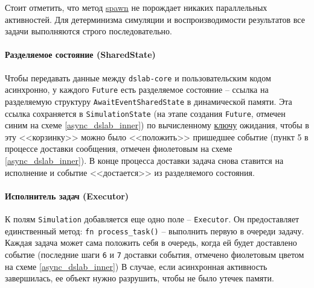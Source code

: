 Стоит отметить, что метод \hyperref[spawn]{spawn} не порождает никаких параллельных активностей. Для детерминизма симуляции и воспроизводимости результатов все задачи выполняются строго последовательно.



\paragraph{Разделяемое состояние (SharedState)}
Чтобы передавать данные между \texttt{dslab-core} и пользовательским кодом асинхронно, у каждого \texttt{Future} есть разделяемое состояние -- ссылка на разделяемую структуру \texttt{AwaitEventSharedState} в динамической памяти. Эта ссылка сохраняется в \texttt{SimulationState} (на этапе создания \texttt{Future}, отмечен синим на схеме \ref{async_dslab_inner}) по вычисленному \hyperref[awaitkey]{ключу} ожидания, чтобы в эту <<корзинку>> можно было <<положить>> пришедшее событие (пункт 5 в процессе доставки сообщения, отмечен фиолетовым на схеме \ref{async_dslab_inner}). В конце процесса  доставки задача снова ставится на исполнение и событие <<достается>> из разделяемого состояния. 

\paragraph{Исполнитель задач (Executor)}
К полям \texttt{Simulation} добавляется еще одно поле -- \texttt{Executor}. Он предоставляет единственный метод: \texttt{fn process\_task()} -- выполнить первую в очереди задачу. Каждая задача может сама положить себя в очередь, когда ей будет доставлено событие (последние шаги \texttt{6} и \texttt{7} доставки события, отмечено фиолетовым цветом на схеме \ref{async_dslab_inner}) В случае, если асинхронная активность завершилась, ее объект нужно разрушить, чтобы не было утечек памяти. 


